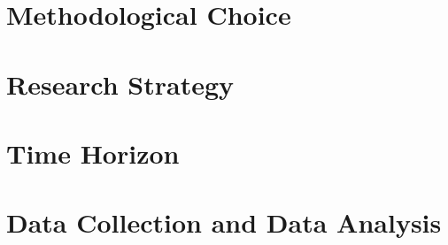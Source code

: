 \section{Methodological Choice}\label{sec:methodological-choice}

%
\section{Research Strategy}\label{sec:research-strategy}

%
\section{Time Horizon}\label{sec:time-horizon}

%
\section{Data Collection and Data Analysis}\label{sec:data-collectiom-and-data-analysis}
